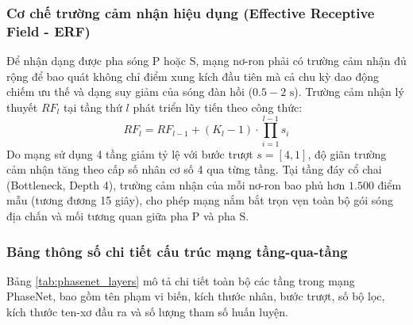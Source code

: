 \documentclass[preprint,1p]{elsarticle}
\begin{document}
\subsubsection{Cơ chế trường cảm nhận hiệu dụng (Effective Receptive Field - ERF)}
Để nhận dạng được pha sóng P hoặc S, mạng nơ-ron phải có trường cảm nhận đủ rộng để bao quát không chỉ điểm xung kích đầu tiên mà cả chu kỳ dao động chiếm ưu thế và dạng suy giảm của sóng đàn hồi ($0.5 - 2\text{ s}$). Trường cảm nhận lý thuyết $RF_l$ tại tầng thứ $l$ phát triển lũy tiến theo công thức:
\begin{equation}
RF_l = RF_{l-1} + (K_l - 1) \cdot \prod_{i=1}^{l-1} s_i
\label{eq:receptive_field}
\end{equation}
Do mạng sử dụng 4 tầng giảm tỷ lệ với bước trượt $s = [4, 1]$, độ giãn trường cảm nhận tăng theo cấp số nhân cơ số 4 qua từng tầng. Tại tầng đáy cổ chai (Bottleneck, Depth 4), trường cảm nhận của mỗi nơ-ron bao phủ hơn $1.500$ điểm mẫu (tương đương 15 giây), cho phép mạng nắm bắt trọn vẹn toàn bộ gói sóng địa chấn và mối tương quan giữa pha P và pha S.

\subsubsection{Bảng thông số chi tiết cấu trúc mạng tầng-qua-tầng}
Bảng \ref{tab:phasenet_layers} mô tả chi tiết toàn bộ các tầng trong mạng PhaseNet, bao gồm tên phạm vi biến, kích thước nhân, bước trượt, số bộ lọc, kích thước ten-xơ đầu ra và số lượng tham số huấn luyện.
\end{document}

